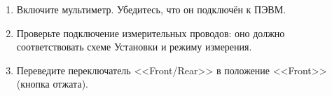 \begin{enumerate}

\item Включите мультиметр. Убедитесь, что он подключён к ПЭВМ.
\item Проверьте подключение измерительных проводов: оно должно соответствовать схеме Установки и режиму измерения.
\item Переведите переключатель <<Front/Rear>> в положение <<Front>> (кнопка отжата). 

\end{enumerate}
